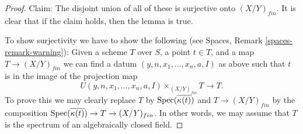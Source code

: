 \begin{proof}
\medskip\noindent
Claim: The disjoint union of all of these is surjective onto $(X/Y)_{fin}$.
It is clear that if the claim holds, then the lemma is true.

\medskip\noindent
To show surjectivity we have to show the following (see
Spaces, Remark \ref{spaces-remark-warning}): Given a scheme $T$ over
$S$, a point $t \in T$, and a map $T \to (X/Y)_{fin}$ we can find a datum
$(y, n, x_1, \ldots, x_n, a, I)$ as above such that
$t$ is in the image of the projection map
$$
U(y, n, x_1, \ldots, x_n, a, I) \times_{(X/Y)_{fin}} T \longrightarrow T.
$$
To prove this we may clearly replace $T$ by
$\mathop{\mathrm{Spec}}(\overline{\kappa(t)})$ and
$T \to (X/Y)_{fin}$ by the composition
$\mathop{\mathrm{Spec}}(\overline{\kappa(t)}) \to T \to (X/Y)_{fin}$.
In other words, we may assume that $T$ is
the spectrum of an algebraically closed field.


\end{proof}
